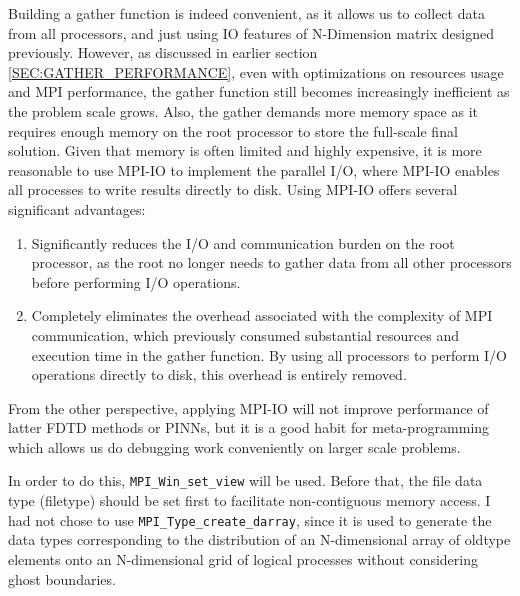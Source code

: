 Building a gather function is indeed convenient, as it allows us to collect data from all processors, 
and just using IO features of N-Dimension matrix designed previously.
However, as discussed in earlier section \ref{SEC:GATHER_PERFORMANCE},
even with optimizations on resources usage and MPI performance, the gather function still becomes 
increasingly inefficient as the problem scale grows.
Also, the gather demands more memory space as it requires enough memory on the root processor to 
store the full-scale final solution.
Given that memory is often limited and highly expensive, it is more reasonable to use MPI-IO to implement the parallel I/O,
where MPI-IO enables all processes to write results directly to disk.
Using MPI-IO offers several significant advantages:
\begin{enumerate}
\item Significantly reduces the I/O and communication burden on the root processor, 
as the root no longer needs to gather data from all other processors before performing I/O operations.
\item Completely eliminates the overhead associated with the complexity of MPI communication, 
which previously consumed substantial resources and execution time in the gather function. 
By using all processors to perform I/O operations directly to disk, this overhead is entirely removed.
\end{enumerate}
From the other perspective, 
applying MPI-IO will not improve performance of latter FDTD methods or PINNs, 
but it is a good habit for meta-programming which allows us do debugging work conveniently on larger scale 
problems.

In order to do this, \texttt{MPI\_Win\_set\_view} will be used.
Before that, the file data type (filetype) should be set first to facilitate non-contiguous memory access.
I had not chose to use \texttt{MPI\_Type\_create\_darray}, since 
it is used to generate the data types corresponding to the distribution of an N-dimensional array 
of oldtype elements onto an N-dimensional grid of logical processes without considering ghost boundaries.

